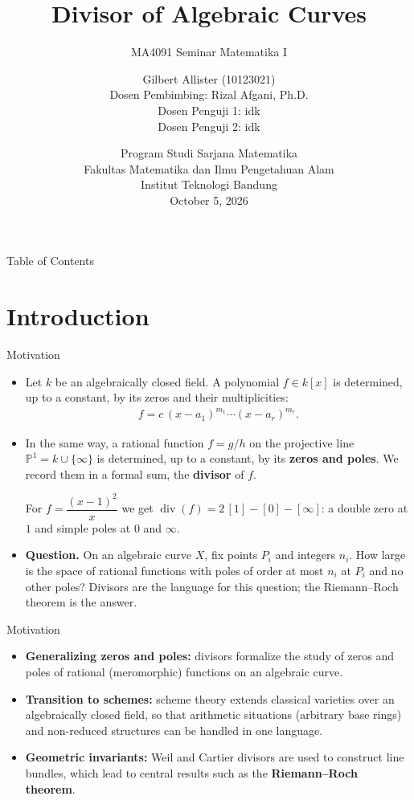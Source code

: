 \documentclass[10pt,aspectratio=1610]{beamer}
\title[Divisor of Algebraic Curves\texorpdfstring{\quad\insertframenumber/\inserttotalframenumber}{}]{Divisor of Algebraic Curves}
\subtitle{MA4091 Seminar Matematika I}
\author[G. Allister (10123021)]{Gilbert Allister (10123021) \\
Dosen Pembimbing: Rizal Afgani, Ph.D. \\
Dosen Penguji 1: idk \\
Dosen Penguji 2: idk
}
\date{ \fontsize{8pt}{8pt}\selectfont
  Program Studi Sarjana Matematika \\
  Fakultas Matematika dan Ilmu Pengetahuan Alam \\
  Institut Teknologi Bandung \\[1cm]
  October 5, 2026} %
\DeclareMathOperator{\divv}{div}
\newcommand{\PP}{\mathbb{P}}
\begin{document}
    \frame{\titlepage}

    \begin{frame}{Table of Contents}
        \tableofcontents
    \end{frame}

    \section{Introduction}

    \begin{frame}{Motivation}
        \begin{itemize}
            \item Let $k$ be an algebraically closed field. A polynomial $f \in k[x]$ is determined, up to a constant, by its zeros and their multiplicities:
            \begin{align*}
                f = c\,(x-a_1)^{m_1}\cdots(x-a_r)^{m_r}.
            \end{align*}
            \item In the same way, a rational function $f = g/h$ on the projective line $\PP^1 = k \cup \{\infty\}$ is determined, up to a constant, by its \textbf{zeros and poles}. We record them in a formal sum, the \textbf{divisor} of $f$.
            \begin{example}
                For $f = \dfrac{(x-1)^2}{x}$ we get $\divv(f) = 2\,[1] - [0] - [\infty]$: a double zero at $1$ and simple poles at $0$ and $\infty$.
            \end{example}
            \item \textbf{Question.} On an algebraic curve $X$, fix points $P_i$ and integers $n_i$. How large is the space of rational functions with poles of order at most $n_i$ at $P_i$ and no other poles? Divisors are the language for this question; the Riemann--Roch theorem is the answer.
        \end{itemize}
    \end{frame}

    \begin{frame}{Motivation}
        \begin{itemize}
            \item \textbf{Generalizing zeros and poles:} divisors formalize the study of zeros and poles of rational (meromorphic) functions on an algebraic curve.
            \item \textbf{Transition to schemes:} scheme theory extends classical varieties over an algebraically closed field, so that arithmetic situations (arbitrary base rings) and non-reduced structures can be handled in one language.
            \item \textbf{Geometric invariants:} Weil and Cartier divisors are used to construct line bundles, which lead to central results such as the \textbf{Riemann--Roch theorem}.
        \end{itemize}
    \end{frame}
\end{document}
